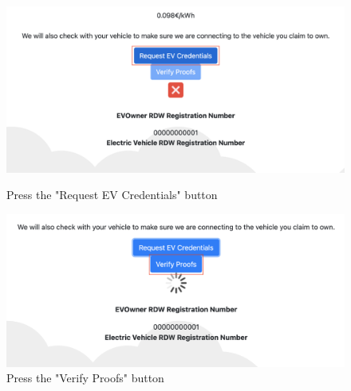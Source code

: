 \begin{figure}[H]
\centering
\begin{minipage}{.5\textwidth}
  \centering
  \includegraphics[width=.9\linewidth]{images/Frontend/Charging/8.png}
  \caption[]{Press the "Request EV Credentials" button}
  \label{fig:charging_screenshot_8}
\end{minipage}%
\begin{minipage}{.5\textwidth}
  \centering
  \includegraphics[width=.9\linewidth]{images/Frontend/Charging/9.png}
  \caption[]{Press the "Verify Proofs" button}
  \label{fig:charging_screenshot_9}
\end{minipage}
\end{figure}

